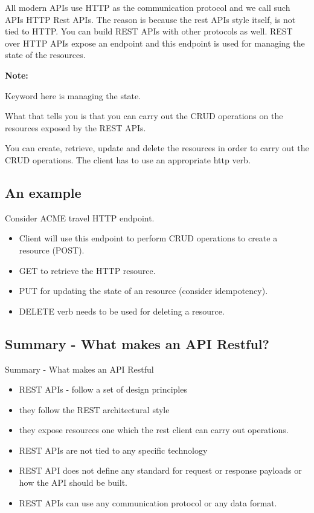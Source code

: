 \documentclass[a4paper, 11pt]{book}
\newenvironment{note}{
    \begin{siderule}
        \textbf{Note: }
        }{
    \end{siderule}
}
\begin{document}
    All modern APIs use HTTP as the communication protocol and we call such APIs HTTP Rest APIs.
    The reason is because the rest APIs style itself, is not tied to HTTP.
    You can build REST APIs with other protocols as well.
    REST over HTTP APIs expose an endpoint and this endpoint is used for managing the state of the resources.

    \begin{note}
        Keyword here is managing the state.
    \end{note}

    What that tells you is that you can carry out the CRUD operations on the resources exposed by the REST APIs.

    You can create, retrieve, update and delete the resources in order to carry out the CRUD operations.
    The client has to use an appropriate http verb.

    \subsection{An example}
    Consider ACME travel HTTP endpoint.
    \begin{itemize}
        \item Client will use this endpoint to perform CRUD operations to create a resource (POST).
        \item GET to retrieve the HTTP resource.
        \item PUT for updating the state of an resource (consider idempotency).
        \item DELETE verb needs to be used for deleting a resource.
    \end{itemize}

    \subsection{Summary - What makes an API Restful?}
    Summary - What makes an API Restful
    \begin{itemize}
        \item REST APIs - follow a set of design principles
        \item they follow the REST architectural style
        \item they expose resources one which the rest client can carry out operations.
        \item REST APIs are not tied to any specific technology
        \item REST API does not define any standard for request or response payloads or how the API should be built.
        \item REST APIs can use any communication protocol or any data format.
    \end{itemize}
\end{document}

